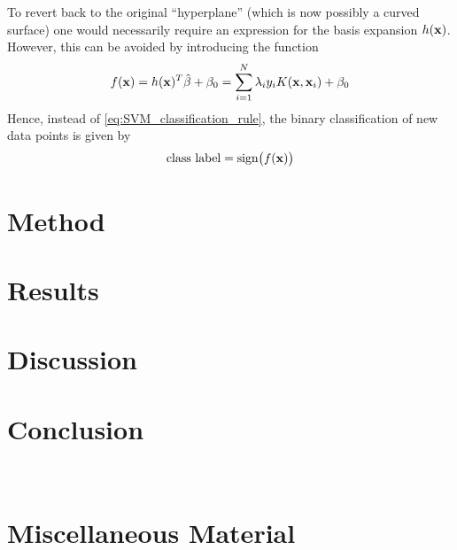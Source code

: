\documentclass[nofootinbib,reprint,english]{revtex4-1}
\begin{document}
To revert back to the original ``hyperplane'' (which is now possibly a curved surface) one would necessarily require an expression for the basis expansion \(h(\vb{x})\). However, this can be avoided by introducing the function
\begin{equation}
f(\vb{x})=h(\vb{x})^T\hat{\beta}+\beta_0=\sum_{i=1}^N\lambda_iy_iK(\vb{x},\vb{x}_i)+\beta_0
\end{equation}
Hence, instead of \eqref{eq:SVM_classification_rule}, the binary classification of new data points is given by
\begin{equation}
\text{class label}=\text{sign}\big(f(\vb{x})\big)
\end{equation}

\section{Method}

\section{Results}


\section{Discussion}

\section{Conclusion}





~
\clearpage
\appendix

\onecolumngrid
\section{Miscellaneous Material}\label{app:misc_material}
\end{document}
